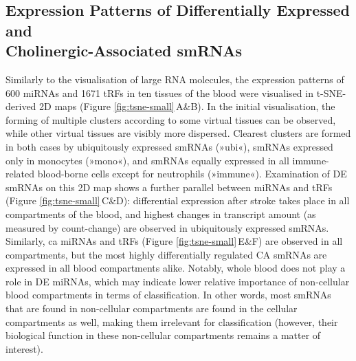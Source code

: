 \subsection{Expression Patterns of Differentially Expressed and\\ Cholinergic-Associated smRNAs}
Similarly to the visualisation of large RNA molecules, the expression patterns of 600 miRNAs and 1671 tRFs in ten tissues of the blood were visualised in t-SNE-derived 2D maps (Figure \ref{fig:tsne-small}\,A\&B). In the initial visualisation, the forming of multiple clusters according to some virtual tissues can be observed, while other virtual tissues are visibly more dispersed. Clearest clusters are formed in both cases by ubiquitously expressed smRNAs (»ubi«), smRNAs expressed only in monocytes (»mono«), and smRNAs equally expressed in all immune-related blood-borne cells except for neutrophils (»immune«). Examination of DE smRNAs on this 2D map shows a further parallel between miRNAs and tRFs (Figure \ref{fig:tsne-small}\,C\&D): differential expression after stroke takes place in all compartments of the blood, and highest changes in transcript amount (as measured by count-change) are observed in ubiquitously expressed smRNAs. Similarly, \acf{ca} miRNAs and tRFs (Figure \ref{fig:tsne-small}\,E\&F) are observed in all compartments, but the most highly differentially regulated CA smRNAs are expressed in all blood compartments alike. Notably, whole blood does not play a role in DE miRNAs, which may indicate lower relative importance of non-cellular blood compartments in terms of classification. In other words, most smRNAs that are found in non-cellular compartments are found in the cellular compartments as well, making them irrelevant for classification (however, their biological function in these non-cellular compartments remains a matter of interest).

